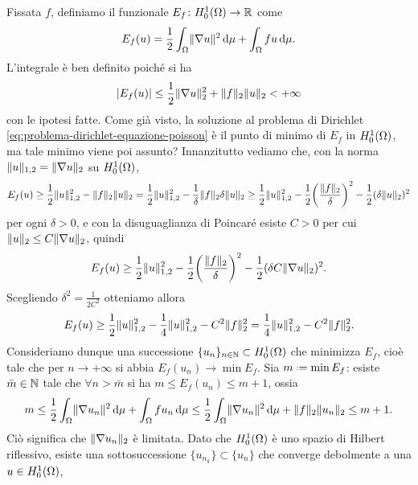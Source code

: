 Fissata $f$, definiamo il funzionale $E_f\colon\sobHc[1]{\Omega}\to\R$ come
\begin{equation}
    E_f(u)=\frac12\int_\Omega\norm{\grad u}^2\,\dd\mu+\int_\Omega fu\,\dd\mu.
    \label{eq:funzionale-energia-poisson}
\end{equation}
L'integrale è ben definito poich\'e si ha
\begin{equation}
    \abs{E_f(u)}\le
    \frac12\norm{\grad u}_2^2+\norm{f}_2\norm{u}_2<
    +\infty
\end{equation}
con le ipotesi fatte.
Come già visto, la soluzione al problema di Dirichlet \eqref{eq:problema-dirichlet-equazione-poisson} è il punto di minimo di $E_f$ in $\sobHc[1]{\Omega}$, ma tale minimo viene poi assunto?
Innanzitutto vediamo che, con la norma $\norm{u}_{1,2}=\norm{\grad u}_2$ su $\sobHc[1]{\Omega}$,
\begin{equation}
    E_f(u)\ge
    \frac12\norm{u}_{1,2}^2-\norm{f}_2\norm{u}_2=
    \frac12\norm{u}_{1,2}^2-\frac1{\delta}\norm{f}_2\delta\norm{u}_2\ge
    \frac12\norm{u}_{1,2}^2-\frac12\biggl(\frac{\norm{f}_2}{\delta}\biggr)^2-\frac12(\delta\norm{u}_2)^2
\end{equation}
per ogni $\delta>0$, e con la disuguaglianza di Poincar\'e esiste $C>0$ per cui $\norm{u}_2\le C\norm{\grad u}_2$, quindi
\begin{equation}
    E_f(u)\ge
    \frac12\norm{u}_{1,2}^2-\frac12\biggl(\frac{\norm{f}_2}{\delta}\biggr)^2-\frac12(\delta C\norm{\grad u}_2)^2.
\end{equation}
Scegliendo $\delta^2=\frac1{2C^2}$ otteniamo allora
\begin{equation}
    E_f(u)\ge
    \frac12\norm{u}_{1,2}^2-\frac14\norm{u}_{1,2}^2-C^2\norm{f}_2^2=
    \frac14\norm{u}_{1,2}^2-C^2\norm{f}_2^2.
\end{equation}
Consideriamo dunque una successione $\{u_n\}_{n\in\N}\subset\sobHc[1]{\Omega}$ che minimizza $E_f$, cioè tale che per $n\to+\infty$ si abbia $E_f(u_n)\to\min E_f$.
Sia $m\defeq\min E_f$: esiste $\bar{m}\in\N$ tale che $\forall n>\bar{m}$ si ha $m\le E_f(u_n)\le m+1$, ossia
\begin{equation}
    m\le
    \frac12\int_\Omega\norm{\grad u_n}^2\,\dd\mu+\int_\Omega fu_n\,\dd\mu\le
    \frac12\int_\Omega\norm{\grad u_n}^2\,\dd\mu+\norm{f}_2\norm{u_n}_2\le
    m+1.
\end{equation}
Ciò significa che $\norm{\grad u_n}_2$ è limitata.
Dato che $\sobHc[1]{\Omega}$ è uno spazio di Hilbert riflessivo, esiste una sottosuccessione $\{u_{n_k}\}\subset\{u_n\}$ che converge debolmente a una $u\in\sobHc[1]{\Omega}$, %
